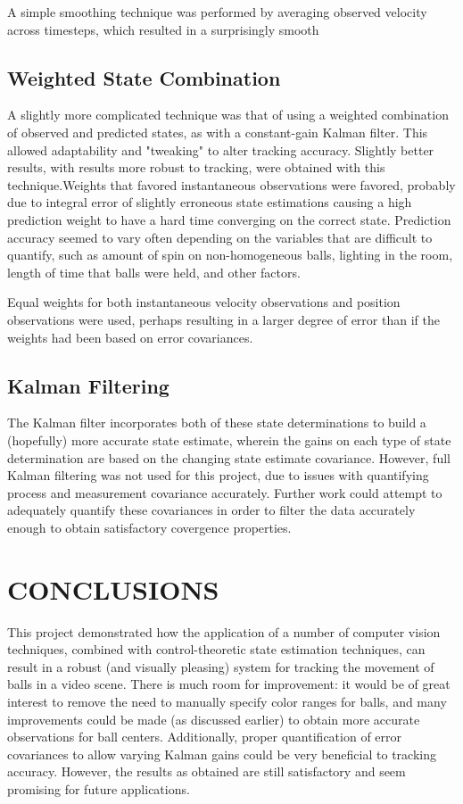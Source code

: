\documentclass[letterpaper, 10 pt, conference]{ieeeconf}  %
\begin{document}
A simple smoothing technique was performed by averaging observed velocity across timesteps, which resulted in a surprisingly smooth 

\subsection{Weighted State Combination}

A slightly more complicated technique was that of using a weighted combination of observed and predicted states, as with a constant-gain Kalman filter. This allowed adaptability and "tweaking" to alter tracking accuracy. Slightly better results, with results more robust to tracking, were obtained with this technique.Weights that favored instantaneous observations were favored, probably due to integral error of slightly erroneous state estimations causing a high prediction weight to have a hard time converging on the correct state. Prediction accuracy seemed to vary often depending on the variables that are difficult to quantify, such as amount of spin on non-homogeneous balls, lighting in the room, length of time that balls were held, and other factors.

Equal weights for both instantaneous velocity observations and position observations were used, perhaps resulting in a larger degree of error than if the weights had been based on error covariances.

\subsection{Kalman Filtering}

 The Kalman filter incorporates both of these state determinations to build a (hopefully) more accurate state estimate, wherein the gains on each type of state determination are based on the changing state estimate covariance. However, full Kalman filtering was not used for this project, due to issues with quantifying process and measurement covariance accurately. Further work could attempt to adequately quantify these covariances in order to filter the data accurately enough to obtain satisfactory covergence properties.

\section{CONCLUSIONS}

This project demonstrated how the application of a number of computer vision techniques, combined with control-theoretic state estimation techniques, can result in a robust (and visually pleasing) system for tracking the movement of balls in a video scene. There is much room for improvement: it would be of great interest to remove the need to manually specify color ranges for balls, and many improvements could be made (as discussed earlier) to obtain more accurate observations for ball centers. Additionally, proper quantification of error covariances to allow varying Kalman gains could be very beneficial to tracking accuracy. However, the results as obtained are still satisfactory and seem promising for future applications.
\end{document}
